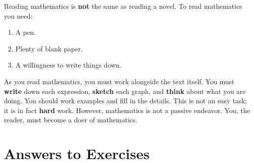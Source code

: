 \documentclass[justified,openany,nofonts]{tufte-book}
\begin{document}
Reading mathematics is \textbf{not} the same as reading a
novel. To read mathematics you need: 
\begin{enumerate}
\item A pen. 
\item Plenty of blank paper. 
\item A willingness to write things down.
\end{enumerate}
As you read mathematics, you must work alongside the text
itself. You must \textbf{write} down each expression, \textbf{sketch}
each graph, and \textbf{think} about what you are doing. You should
work examples and fill in the details. This is not an easy task; it is
in fact \textbf{hard} work. However, mathematics is not a passive
endeavor. You, the reader, must become a doer of mathematics.



\setcounter{chapter}{-1}






















%
%

\finalizeanswers
\chapter*{Answers to Exercises}
\small
{}
\normalsize
\backmatter
\printindex
\end{document}
